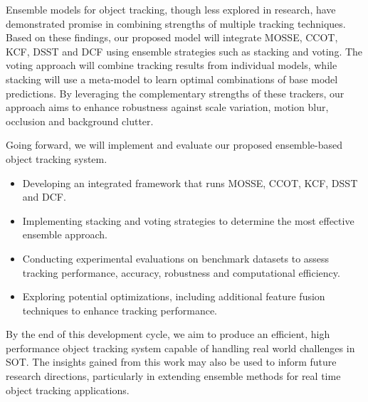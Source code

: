 \documentclass{article}
\begin{document}
Ensemble models for object tracking, though less explored in research, have demonstrated promise in combining strengths of multiple tracking techniques. Based on these findings, our proposed model will integrate MOSSE, CCOT, KCF, DSST and DCF using ensemble strategies such as stacking and voting. The voting approach will combine tracking results from individual models, while stacking will use a meta-model to learn optimal combinations of base model predictions. By leveraging the complementary strengths of these trackers, our approach aims to enhance robustness against scale variation, motion blur, occlusion and background clutter.

Going forward, we will implement and evaluate our proposed ensemble-based object tracking system.

\begin{itemize}
  \item Developing an integrated framework that runs MOSSE, CCOT, KCF, DSST and DCF.
  \item Implementing stacking and voting strategies to determine the most effective ensemble approach.
  \item Conducting experimental evaluations on benchmark datasets to assess tracking performance, accuracy, robustness and computational efficiency.
  \item Exploring potential optimizations, including additional feature fusion techniques to enhance tracking performance.
\end{itemize}

By the end of this development cycle, we aim to produce an efficient, high performance object tracking system capable of handling real world challenges in SOT. The insights gained from this work may also be used to inform future research directions, particularly in extending ensemble methods for real time object tracking applications.
\end{document}
